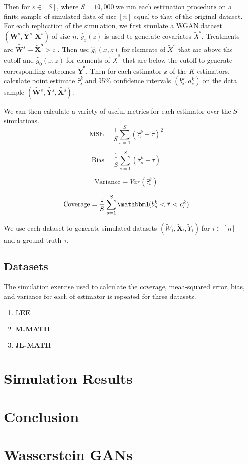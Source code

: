 \documentclass[12pt]{article}
\theoremstyle{definition}
\begin{document}
Then for $s \in [S]$, where $S = 10,000$ we run each estimation procedure on a finite sample of simulated data of size $[n]$ equal to that of the original dataset. For each replication of the simulation, we first simulate a WGAN dataset $(\tilde {\bm W^s}, \tilde {\bm Y^s}, \tilde {\bm X^s})$ of size $n$.  $\hat g_x(z)$ is used to generate covariates $\tilde X^s$. Treatments are $\tilde {\bm W^s} = \bm{\tilde X^s} > c$ . Then use $\hat g_1(x, z)$ for elements of $\tilde X^s$ that are above the cutoff and $\hat g_0(x, z)$ for elements of $\tilde X^s$ that are below the cutoff to generate corresponding outcomes $\bm {\tilde Y^s}$. Then for each estimator $k$ of the $K$ estimators, calculate point estimate $\hat \tau^k_s $ and 95\% confidence intervals $( b^k_s, a^k_s)$ on the data sample $(\tilde {\bm W^s}, \tilde {\bm Y^s}, \tilde {\bm X^s})$.  

We can then calculate a variety of useful metrics for each estimator over the $S$ simulations. 
\[ \mbox{MSE} = \frac 1S \sum \limits_{s=1}^S (\hat \tau^k_s - \tilde \tau)^2 \] 

\[ \mbox{Bias} =  \frac 1S \sum \limits_{s=1}^S (\hat \tau^k_s - \tilde \tau) \] 

\[ \mbox{Variance} = Var(\hat \tau^k_s) \] 

\[ \mbox{Coverage} = \frac 1S \sum \limits_{s=1}^S \mathbbm 1 ( b^k_s < \tilde \tau < a^k_s) \] 

We use each dataset to generate simulated datasets $(\tilde W_i, \bm \tilde X_i, \tilde Y_i)$ for $i \in [n]$ and a ground truth $\tau$. 


\subsection{Datasets}

The simulation exercise used to calculate the coverage, mean-squared error, bias, and variance for each of estimator is repeated for three datasets. 

\begin{enumerate} 
\item \textbf{LEE} \citet{lee2010regression}
\item \textbf{M-MATH} \citet{matsudaira2008mandatory}
\item \textbf{JL-MATH} \citet{jacob2004remedial}
\end{enumerate} 

\section{Simulation Results} 

\section{Conclusion} 

\newpage



\appendix

\section{Wasserstein GANs} 


\label{sec:wgan} 
\end{document}
